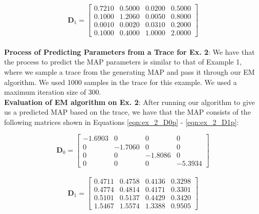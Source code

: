 \documentclass[a4paper,11pt,titlepage]{article}
\begin{document}
\begin{equation}
  \mathbf{D}_1 = \begin{bmatrix}
 0.7210  &  0.5000  &  0.0200  &  0.5000 \\
    0.1000  &  1.2060   & 0.0050  &  0.8000 \\
    0.0010   & 0.0020  &  0.0310  &  0.2000 \\
    0.1000  &  0.4000  &  1.0000  &  2.0000
    \end{bmatrix}
    \label{eqn:ex_2_D1}
\end{equation} \\

\textbf{Process of Predicting Parameters from a Trace for Ex. 2}: We have that the process to predict the MAP parameters is similar to that of Example 1, where we sample a trace from the generating MAP and pass it through our EM algorithm. We used 1000 samples in the trace for this example. We used a maximum iteration size of 300. \\

\textbf{Evaluation of EM algorithm on Ex. 2}: After running our algorithm to give us a predicted MAP based on the trace, we have that the MAP consists of the following matrices shown in Equations \ref{eqn:ex_2_D0p} - \ref{eqn:ex_2_D1p}:

\begin{equation}
  \mathbf{D}_0 = \begin{bmatrix}
-1.6903    &     0     &    0    &     0 \\
0  & -1.7060    &     0     &    0 \\
0     &    0 &  -1.8086    &     0 \\
0    &     0    &     0  & -5.3934
    \end{bmatrix}
    \label{eqn:ex_2_D0p}
\end{equation} \\
    
\begin{equation}
  \mathbf{D}_1 = \begin{bmatrix}
    0.4711  &  0.4758 &   0.4136  &  0.3298 \\
    0.4774  &  0.4814  &  0.4171  &  0.3301 \\
    0.5101  &  0.5137  &  0.4429  &  0.3420 \\
    1.5467  &  1.5574  &  1.3388  &  0.9505
    \end{bmatrix}
    \label{eqn:ex_2_D1p}
\end{equation} \\
\end{document}
